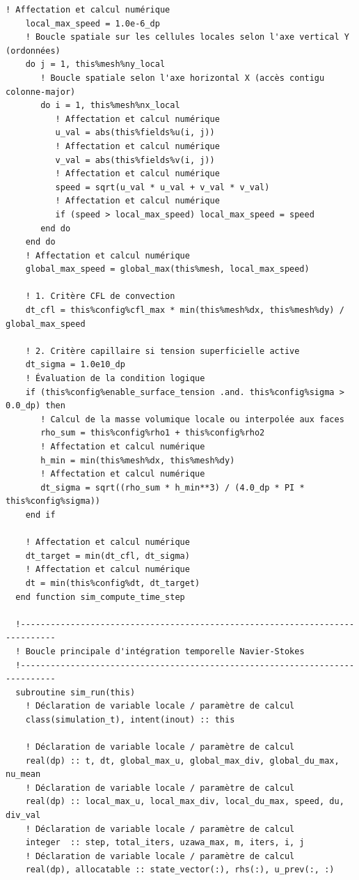 \documentclass[10pt,a4paper,oneside]{book}
\begin{document}
\begin{lstlisting}[language={[95]Fortran}]
    ! Affectation et calcul numérique
    local_max_speed = 1.0e-6_dp
    ! Boucle spatiale sur les cellules locales selon l'axe vertical Y (ordonnées)
    do j = 1, this%mesh%ny_local
       ! Boucle spatiale selon l'axe horizontal X (accès contigu colonne-major)
       do i = 1, this%mesh%nx_local
          ! Affectation et calcul numérique
          u_val = abs(this%fields%u(i, j))
          ! Affectation et calcul numérique
          v_val = abs(this%fields%v(i, j))
          ! Affectation et calcul numérique
          speed = sqrt(u_val * u_val + v_val * v_val)
          ! Affectation et calcul numérique
          if (speed > local_max_speed) local_max_speed = speed
       end do
    end do
    ! Affectation et calcul numérique
    global_max_speed = global_max(this%mesh, local_max_speed)

    ! 1. Critère CFL de convection
    dt_cfl = this%config%cfl_max * min(this%mesh%dx, this%mesh%dy) / global_max_speed

    ! 2. Critère capillaire si tension superficielle active
    dt_sigma = 1.0e10_dp
    ! Évaluation de la condition logique
    if (this%config%enable_surface_tension .and. this%config%sigma > 0.0_dp) then
       ! Calcul de la masse volumique locale ou interpolée aux faces
       rho_sum = this%config%rho1 + this%config%rho2
       ! Affectation et calcul numérique
       h_min = min(this%mesh%dx, this%mesh%dy)
       ! Affectation et calcul numérique
       dt_sigma = sqrt((rho_sum * h_min**3) / (4.0_dp * PI * this%config%sigma))
    end if

    ! Affectation et calcul numérique
    dt_target = min(dt_cfl, dt_sigma)
    ! Affectation et calcul numérique
    dt = min(this%config%dt, dt_target)
  end function sim_compute_time_step

  !-----------------------------------------------------------------------------
  ! Boucle principale d'intégration temporelle Navier-Stokes
  !-----------------------------------------------------------------------------
  subroutine sim_run(this)
    ! Déclaration de variable locale / paramètre de calcul
    class(simulation_t), intent(inout) :: this

    ! Déclaration de variable locale / paramètre de calcul
    real(dp) :: t, dt, global_max_u, global_max_div, global_du_max, nu_mean
    ! Déclaration de variable locale / paramètre de calcul
    real(dp) :: local_max_u, local_max_div, local_du_max, speed, du, div_val
    ! Déclaration de variable locale / paramètre de calcul
    integer  :: step, total_iters, uzawa_max, m, iters, i, j
    ! Déclaration de variable locale / paramètre de calcul
    real(dp), allocatable :: state_vector(:), rhs(:), u_prev(:, :)


\end{lstlisting}
\end{document}

